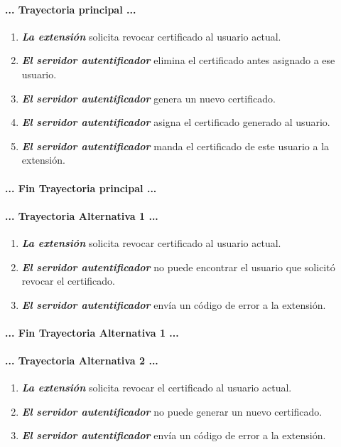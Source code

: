 \documentclass[12pt, a4paper, titlepage]{report}
\begin{document}
		\paragraph{... Trayectoria principal ...}
		\begin{enumerate}
		    \item \textbf{\textit{La extensión}} solicita revocar certificado al usuario actual.
		    
		    \item \textbf{\textit{El servidor autentificador}} elimina el certificado antes asignado a ese usuario.
		    
		    \item \textbf{\textit{El servidor autentificador}} genera un nuevo certificado.
		    
		    \item \textbf{\textit{El servidor autentificador}} asigna el certificado generado al usuario.
		    
		    \item \textbf{\textit{El servidor autentificador}} manda el certificado de este usuario a la extensión.
		\end{enumerate}
		\paragraph{... Fin Trayectoria principal ...}
		
		\paragraph{... Trayectoria Alternativa 1 ...}
		\begin{enumerate}
		    \item \textbf{\textit{La extensión}} solicita revocar certificado al usuario actual.
		    
		    \item \textbf{\textit{El servidor autentificador}} no puede encontrar el usuario que solicitó revocar el certificado.
		    
		    \item \textbf{\textit{El servidor autentificador}} envía un código de error a la extensión.
		\end{enumerate}
		\paragraph{... Fin Trayectoria Alternativa 1 ...}
		
		\paragraph{... Trayectoria Alternativa 2 ...}
		\begin{enumerate}
		    \item \textbf{\textit{La extensión}} solicita revocar el certificado al usuario actual.
		     
		     \item \textbf{\textit{El servidor autentificador}} no puede generar un nuevo certificado.
		     
		     \item \textbf{\textit{El servidor autentificador}} envía un código de error a la extensión.
		\end{enumerate}
\end{document}
